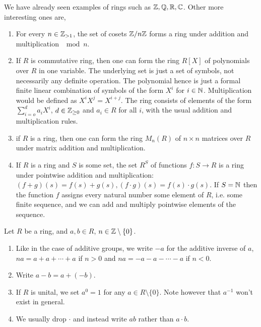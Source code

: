 \begin{example}
  We have already seen examples of rings such as $\mathbb Z,\mathbb Q,\mathbb R,\mathbb C$. Other more interesting
  ones are,
  \begin{enumerate}
    \item For every $n\in\mathbb Z_{>1}$, the set of cosets $\mathbb Z/n\mathbb Z$ forms a ring under
      addition and multiplication $\mod n$.
    \item If $R$ is commutative ring, then one can form the ring $R[X]$ of polynomials
      over $R$ in one variable. The underlying set is just a set of symbols, not
      necessarily any definite operation. The polynomial hence is just a formal finite
      linear combination of symbols of the form $X^i$ for $i\in\mathbb N$. Multiplication would
      be defined as $X^iX^j=X^{i+j}$. The ring consists of elements of the form
      $\sum_{i=o}^d a_iX^i$, $d\in\mathbb Z_{\geq 0}$ and $a_i\in R$ for all $i$, with the usual
      addition and multiplication rules.
    \item if $R$ is a ring, then one can form the ring $M_n(R)$ of $n\times n$ matrices
      over $R$ under matrix addition and multiplication.
    \item If $R$ is a ring and $S$ is some set, the set $R^S$ of functions $f:S\to R$ is
      a ring under pointwise addition and multiplication: $(f+g)(s)=f(s)+g(s), (f\cdot
      g)(s)=f(s)\cdot g(s)$. If $S=\mathbb N$ then the function $f$ assigns every natural number
      some element of $R$, i.e. some finite sequence, and we can add and multiply
      pointwise elements of the sequence.
  \end{enumerate}
\end{example}

\begin{remark}
  Let $R$ be a ring, and $a,b\in R$, $n\in\mathbb Z\setminus \{0\}$.
  \begin{enumerate}
    \item Like in the case of additive groups, we write $-a$ for the additive inverse of
      $a$, $na=a+a+\cdots+a$ if $n>0$ and $na=-a-a-\cdots-a$ if $n<0$.
    \item Write $a-b=a+(-b)$.
    \item If $R$ is unital, we set $a^0=1$ for any $a\in R\setminus\{0\}$. Note however
      that $a^{-1}$ won't exist in general.
    \item We usually drop $\cdot$ and instead write $ab$ rather than $a\cdot b$.
  \end{enumerate}
\end{remark}

